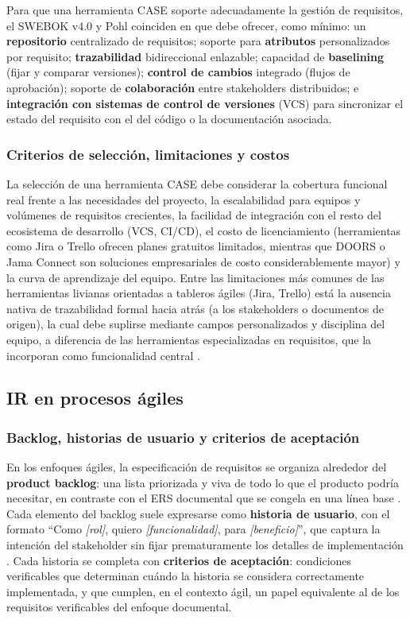 \documentclass[11pt,a4paper]{article}
\begin{document}
Para que una herramienta CASE soporte adecuadamente la gestión de
requisitos, el SWEBOK v4.0 \cite{swebok_v4} y Pohl \cite{pohl2025}
coinciden en que debe ofrecer, como mínimo: un \textbf{repositorio}
centralizado de requisitos; soporte para \textbf{atributos}
personalizados por requisito; \textbf{trazabilidad} bidireccional
enlazable; capacidad de \textbf{baselining} (fijar y comparar versiones);
\textbf{control de cambios} integrado (flujos de aprobación); soporte de
\textbf{colaboración} entre stakeholders distribuidos; e
\textbf{integración con sistemas de control de versiones} (VCS) para
sincronizar el estado del requisito con el del código o la documentación
asociada.
 
\subsubsection{Criterios de selección, limitaciones y costos}
 
La selección de una herramienta CASE debe considerar la cobertura
funcional real frente a las necesidades del proyecto, la escalabilidad
para equipos y volúmenes de requisitos crecientes, la facilidad de
integración con el resto del ecosistema de desarrollo (VCS, CI/CD), el
costo de licenciamiento (herramientas como Jira o Trello ofrecen planes
gratuitos limitados, mientras que DOORS o Jama Connect son soluciones
empresariales de costo considerablemente mayor) y la curva de aprendizaje
del equipo. Entre las limitaciones más comunes de las herramientas
livianas orientadas a tableros ágiles (Jira, Trello) está la ausencia
nativa de trazabilidad formal hacia atrás (a los stakeholders o
documentos de origen), la cual debe suplirse mediante campos
personalizados y disciplina del equipo, a diferencia de las herramientas
especializadas en requisitos, que la incorporan como funcionalidad
central \cite{pohl2025}.


\subsection{IR en procesos ágiles}
\subsubsection{Backlog, historias de usuario y criterios de aceptación}
 
En los enfoques ágiles, la especificación de requisitos se organiza
alrededor del \textbf{product backlog}: una lista priorizada y viva de
todo lo que el producto podría necesitar, en contraste con el ERS
documental que se congela en una línea base \cite{cohn2004}. Cada elemento
del backlog suele expresarse como \textbf{historia de usuario}, con el
formato ``Como \emph{[rol]}, quiero \emph{[funcionalidad]}, para
\emph{[beneficio]}'', que captura la intención del stakeholder sin fijar
prematuramente los detalles de implementación \cite{cohn2004}. Cada
historia se completa con \textbf{criterios de aceptación}: condiciones
verificables que determinan cuándo la historia se considera correctamente
implementada, y que cumplen, en el contexto ágil, un papel equivalente al
de los requisitos verificables del enfoque documental.
 
\end{document}
